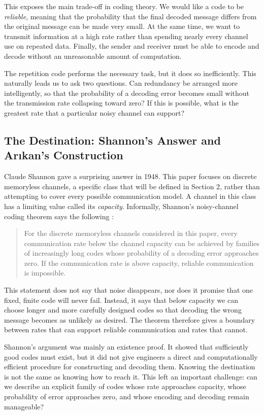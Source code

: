 This exposes the main trade-off in coding theory. We would like a code to be \emph{reliable}, meaning that the probability that the final decoded message differs from the original message can be made very small. At the same time, we want to transmit information at a high rate rather than spending nearly every channel use on repeated data. Finally, the sender and receiver must be able to encode and decode without an unreasonable amount of computation.

The repetition code performs the necessary task, but it does so inefficiently. This naturally leads us to ask two questions. Can redundancy be arranged more intelligently, so that the probability of a decoding error becomes small without the transmission rate collapsing toward zero? If this is possible, what is the greatest rate that a particular noisy channel can support?

\subsection{The Destination: Shannon's Answer and Arıkan's Construction}

Claude Shannon gave a surprising answer in 1948. This paper focuses on discrete memoryless channels, a specific class that will be defined in Section 2, rather than attempting to cover every possible communication model. A channel in this class has a limiting value called its \emph{capacity}. Informally, Shannon's noisy-channel coding theorem says the following \cite{Shannon1948}:

\begin{quote}
For the discrete memoryless channels considered in this paper, every communication rate below the channel capacity can be achieved by families of increasingly long codes whose probability of a decoding error approaches zero. If the communication rate is above capacity, reliable communication is impossible.
\end{quote}

This statement does not say that noise disappears, nor does it promise that one fixed, finite code will never fail. Instead, it says that below capacity we can choose longer and more carefully designed codes so that decoding the wrong message becomes as unlikely as desired. The theorem therefore gives a boundary between rates that can support reliable communication and rates that cannot.

Shannon's argument was mainly an existence proof. It showed that sufficiently good codes must exist, but it did not give engineers a direct and computationally efficient procedure for constructing and decoding them. Knowing the destination is not the same as knowing how to reach it. This left an important challenge: can we describe an explicit family of codes whose rate approaches capacity, whose probability of error approaches zero, and whose encoding and decoding remain manageable?


